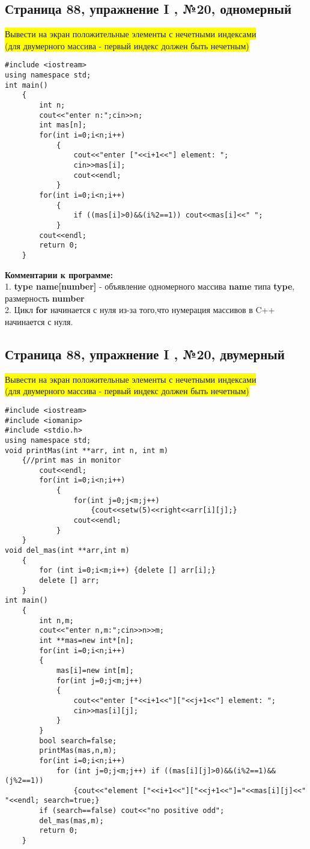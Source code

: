 \documentclass[11pt]{article}
\begin{document}
\begin{flushleft}
\newpage
\begin{center}
\section{Страница 88, упражнение I , №20, одномерный}
\colorbox{yellow}{Вывести на экран положительные элементы с нечетными индексами}\\
\colorbox{yellow}{(для двумерного массива - первый индекс должен быть нечетным)}
\end{center}
\begin{lstlisting}
#include <iostream>
using namespace std;
int main()
	{
		int n;
		cout<<"enter n:";cin>>n;
		int mas[n];
		for(int i=0;i<n;i++)
			{
				cout<<"enter ["<<i+1<<"] element: ";
				cin>>mas[i];
				cout<<endl;
			}
		for(int i=0;i<n;i++)
			{
				if ((mas[i]>0)&&(i%2==1)) cout<<mas[i]<<" ";
			}
		cout<<endl;
		return 0;
	}
\end{lstlisting}

\textbf{Комментарии к программе:} \\
1. \textbf{type name[number]} - объявление одномерного массива \textbf{name} типа \textbf{type}, размерность \textbf{number}\\
2. Цикл \textbf{for} начинается с нуля из-за того,что нумерация массивов в C++ начинается с нуля.\\

\newpage
\begin{center}
\section{Страница 88, упражнение I , №20, двумерный}
\colorbox{yellow}{Вывести на экран положительные элементы с нечетными индексами}\\
\colorbox{yellow}{(для двумерного массива - первый индекс должен быть нечетным)}
\end{center}
\begin{lstlisting}
#include <iostream>
#include <iomanip>
#include <stdio.h>
using namespace std;
void printMas(int **arr, int n, int m)
    {//print mas in monitor
        cout<<endl;
        for(int i=0;i<n;i++)
            {
                for(int j=0;j<m;j++)
                    {cout<<setw(5)<<right<<arr[i][j];}
                cout<<endl;
            }
    }
void del_mas(int **arr,int m)
    {
        for (int i=0;i<m;i++) {delete [] arr[i];}
        delete [] arr;
    }    
int main()
	{
		int n,m;
		cout<<"enter n,m:";cin>>n>>m;
		int **mas=new int*[n]; 
		for(int i=0;i<n;i++)
		{		
			mas[i]=new int[m];
			for(int j=0;j<m;j++)
			{
				cout<<"enter ["<<i+1<<"]["<<j+1<<"] element: ";
				cin>>mas[i][j];
			}	
		}
		bool search=false;
		printMas(mas,n,m);
		for(int i=0;i<n;i++)
			for (int j=0;j<m;j++) if ((mas[i][j]>0)&&(i%2==1)&&(j%2==1)) 
				{cout<<"element ["<<i+1<<"]["<<j+1<<"]="<<mas[i][j]<<" "<<endl; search=true;}
		if (search==false) cout<<"no positive odd";
		del_mas(mas,m);
		return 0;
	}
\end{lstlisting}



\end{flushleft}
\end{document}
